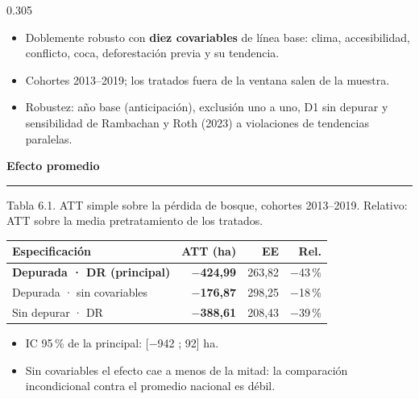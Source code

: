 \documentclass[final,t]{beamer}
\newcommand{\seccion}[2]{%
  \par\vspace{0.5\baselineskip}%
  {\color{dosel}\Large\bfseries #1\hfill{\color{tenue}\normalsize\mdseries #2}}\par
  \vspace{-0.35\baselineskip}%
  {\color{dosel}\rule{\linewidth}{2.2pt}}\par
  \vspace{0.25\baselineskip}%
}
\newcommand{\nota}[1]{{\color{tenue}\small #1\par}}
\begin{document}
\begin{frame}[t]{}
\begin{columns}[t]
\begin{column}{0.305\paperwidth}
\begin{itemize}
  \item Doblemente robusto con \textbf{diez covariables} de línea base: clima, accesibilidad,
        conflicto, coca, deforestación previa y su tendencia.
  \item Cohortes 2013--2019; los tratados fuera de la ventana salen de la muestra.
  \item Robustez: año base (anticipación), exclusión uno a uno, D1 sin depurar y
        sensibilidad de Rambachan y Roth (2023) a violaciones de tendencias paralelas.
\end{itemize}

\seccion{Efecto promedio}{}
\nota{Tabla 6.1. ATT simple sobre la pérdida de bosque, cohortes 2013--2019. Relativo: ATT sobre
la media pretratamiento de los tratados.}
\begin{center}
\begin{tabularx}{\linewidth}{Xrrr}
\toprule
\rowcolor{dosel}
\textcolor{papel}{\textbf{Especificación}} & \textcolor{papel}{\textbf{ATT (ha)}} &
\textcolor{papel}{\textbf{EE}} & \textcolor{papel}{\textbf{Rel.}}\\
\midrule
\rowcolor{orofondo}
\textbf{Depurada · DR (principal)} & \textcolor{reduccion}{\textbf{$-$424,99}} & 263,82 & $-$43\,\%\\
Depurada · sin covariables & \textcolor{reduccion}{\textbf{$-$176,87}} & 298,25 & $-$18\,\%\\
Sin depurar · DR           & \textcolor{reduccion}{\textbf{$-$388,61}} & 208,43 & $-$39\,\%\\
\bottomrule
\end{tabularx}
\end{center}
\begin{itemize}
  \item IC 95\,\% de la principal: [$-$942 ; 92] ha.
  \item[\textcolor{brasa}{\rule{0.45ex}{0.45ex}}] Sin covariables el efecto cae a menos de la mitad:
        la comparación incondicional contra el promedio nacional es débil.
\end{itemize}


\end{column}
\end{columns}
\end{frame}
\end{document}
